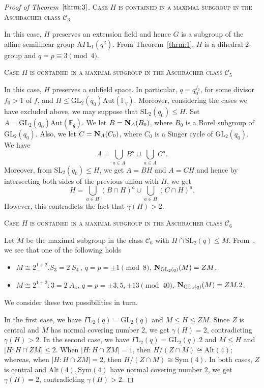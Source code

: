 \documentclass{amsart}
\begin{document}
\begin{proof}[Proof of Theorem~$\ref{thrm:3}$]
\smallskip

\noindent\textsc{Case $H$ is contained in a maximal subgroup in the Aschbacher class $\mathcal{C}_3$} 

\smallskip

\noindent In this case, $H$ preserves an extension field and hence $G$ is a subgroup of the affine semilinear group $\mathrm{A}\Gamma\mathrm{L}_1(q^2)$. From Theorem~\ref{thrm:1}, $H$ is a dihedral $2$-group and $q=p\equiv 3\pmod 4$.




\smallskip

\noindent\textsc{Case $H$ is contained in a maximal subgroup in the Aschbacher class $\mathcal{C}_5$} 

\smallskip

\noindent In this case, $H$ preserves a subfield space. In particular, $q=q_0^{f_0}$, for some divisor $f_0>1$ of $f$, and $H\le\mathrm{GL}_2(q_0)\mathrm{Aut}(\mathbb{F}_q)$. Moreover, considering the cases we have excluded above, we may suppose that $\mathrm{SL}_2(q_0)\le H$. Set $A=\mathrm{GL}_2(q_0)\mathrm{Aut}(\mathbb{F}_q)$. We let $B={\bf N}_A(B_0)$, where $B_0$ is a Borel subgroup of $\mathrm{GL}_2(q_0)$. Also, we let $C={\bf N}_A(C_0)$, where $C_0$ is a Singer cycle of $\mathrm{GL}_2(q_0)$. We have
$$A=\bigcup_{a\in A}B^a\cup\bigcup_{a\in A}C^a.$$ 
Moreover, from $\mathrm{SL}_2(q_0)\le H$, we get $A=BH$ and $A=CH$ and hence by intersecting both sides of the previous union with $H$, we get
$$H=\bigcup_{a\in H}(B\cap H)^a\cup\bigcup_{a\in H}(C\cap H)^a.$$
However, this contradicts the fact that $\gamma(H)>2$. 


\smallskip

\noindent\textsc{Case $H$ is contained in a maximal subgroup in the Aschbacher class $\mathcal{C}_6$} 

\smallskip

\noindent Let $M$ be the maximal subgroup in the class $\mathcal{C}_6$ with $H\cap\mathrm{SL}_2(q)\le M$. From~\cite[Table~8.1]{bray}, we see that one of the following holds
\begin{itemize}
\item $M\cong 2_-^{1+2}.S_3=2^\cdot S_4^-$, $q=p=\pm 1\pmod 8$, ${\bf N}_{\mathrm{GL}_2(q)}(M)=Z M$, 
\item $M\cong 2_-^{1+2}:3=2^\cdot A_4$, $q=p=\pm 3,5,\pm 13\pmod {40}$, ${\bf N}_{\mathrm{GL}_2(q)}(M)=Z M.2$.
\end{itemize}
We consider these two possibilities in turn.

In the first case, we have $\Gamma\mathrm{L}_2(q)=\mathrm{GL}_2(q)$ and $M\le H\le ZM$. Since $Z$ is central and $M$ has normal covering number $2$, we get $\gamma(H)=2$, contradicting $\gamma(H)>2$. In the second case, we have $\Gamma\mathrm{L}_2(q)=\mathrm{GL}_2(q).2$ and $M\le H$ and $|H:H\cap ZM|\le 2$. When $|H:H\cap ZM|=1$, then $H/(Z\cap M)\cong \mathrm{Alt}(4)$; whereas, when $|H:H\cap ZM|=2$, then $H/(Z\cap M)\cong \mathrm{Sym}(4)$. In both cases, $Z$ is central and $\mathrm{Alt}(4),\mathrm{Sym}(4)$ have normal covering number $2$, we get $\gamma(H)=2$, contradicting $\gamma(H)>2$.



\end{proof}
\end{document}
